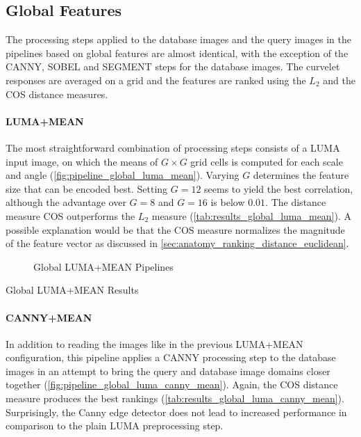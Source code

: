 \subsection{Global Features}

The processing steps applied to the database images and the query images in the
pipelines based on global features are almost identical, with the exception of
the CANNY, SOBEL and SEGMENT steps for the database images. The curvelet
responses are averaged on a grid and the features are ranked using the $L_2$
and the COS distance measures.

\paragraph{LUMA+MEAN}

The most straightforward combination of processing steps consists of a LUMA
input image, on which the means of $G \times G$ grid cells is computed for each
scale and angle (\autoref{fig:pipeline_global_luma_mean}).  Varying $G$
determines the feature size that can be encoded best. Setting $G=12$ seems to
yield the best correlation, although the advantage over $G=8$ and $G=16$ is
below $0.01$. The distance measure COS outperforms the $L_2$ measure
(\autoref{tab:results_global_luma_mean}). A possible explanation would be that
the COS measure normalizes the magnitude of the feature vector as discussed in
\autoref{sec:anatomy_ranking_distance_euclidean}.

\begin{figure}[h]
    \centering
    
    \caption[Global LUMA+MEAN Pipelines]{
        Global LUMA+MEAN Pipelines
    }
    \label{fig:pipeline_global_luma_mean}
\end{figure}

\begin{table}[h]
    \centering
    
    \caption[Global LUMA+MEAN Results]{
        Global LUMA+MEAN Results
    }
    \label{tab:results_global_luma_mean}
\end{table}

\FloatBarrier
\paragraph{CANNY+MEAN}

In addition to reading the images like in the previous LUMA+MEAN configuration,
this pipeline applies a CANNY processing step to the database images in an
attempt to bring the query and database image domains closer together
(\autoref{fig:pipeline_global_luma_canny_mean}). Again, the COS distance
measure produces the best rankings
(\autoref{tab:results_global_luma_canny_mean}).  Surprisingly, the Canny edge
detector does not lead to increased performance in comparison to the plain LUMA
preprocessing step.

